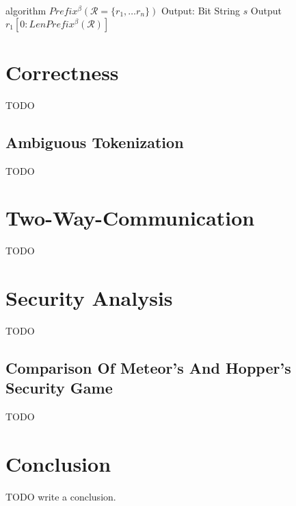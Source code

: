 \documentclass[english,version-2020-11]{uzl-thesis}
\begin{document}
\begin{Pseudocode}
algorithm $Prefix^\beta(	\mathcal R = \{ r_1, \dots r_n \})$
	Output: Bit String $s$
	Output $r_1[0: LenPrefix^\beta(\mathcal{R})]$
\end{Pseudocode}





\chapter{Correctness}

TODO

\section{Ambiguous Tokenization}

TODO

\chapter{Two-Way-Communication}

TODO

\chapter{Security Analysis}

TODO

\section{Comparison Of Meteor's And Hopper's Security Game}

TODO

\chapter{Conclusion}




%

TODO write a conclusion.

%
\end{document}
